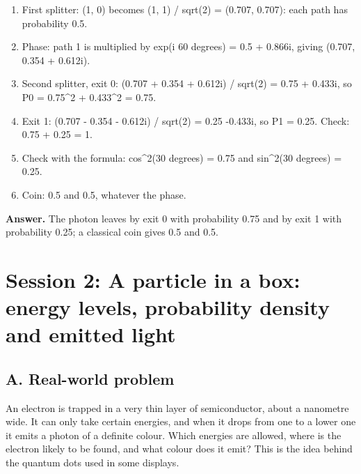 \documentclass[11pt,a4paper]{article}
\begin{document}
\begin{enumerate}[nosep]
\item First splitter: (1, 0) becomes (1, 1) / sqrt(2) = (0.707, 0.707): each path has probability 0.5.
\item Phase: path 1 is multiplied by exp(i 60 degrees) = 0.5 + 0.866i, giving (0.707, 0.354 + 0.612i).
\item Second splitter, exit 0: (0.707 + 0.354 + 0.612i) / sqrt(2) = 0.75 + 0.433i, so P0 = 0.75\textasciicircum{}2 + 0.433\textasciicircum{}2 = 0.75.
\item Exit 1: (0.707 - 0.354 - 0.612i) / sqrt(2) = 0.25 -0.433i, so P1 = 0.25. Check: 0.75 + 0.25 = 1.
\item Check with the formula: cos\textasciicircum{}2(30 degrees) = 0.75 and sin\textasciicircum{}2(30 degrees) = 0.25.
\item Coin: 0.5 and 0.5, whatever the phase.
\end{enumerate}
\textbf{Answer.} The photon leaves by exit 0 with probability 0.75 and by exit 1 with probability 0.25; a classical coin gives 0.5 and 0.5.

\section{Session 2: A particle in a box: energy levels, probability density and emitted light}

\subsection*{A. Real-world problem}
An electron is trapped in a very thin layer of semiconductor, about a nanometre wide. It can only take certain energies, and when it drops from one to a lower one it emits a photon of a definite colour. Which energies are allowed, where is the electron likely to be found, and what colour does it emit? This is the idea behind the quantum dots used in some displays.
\end{document}
